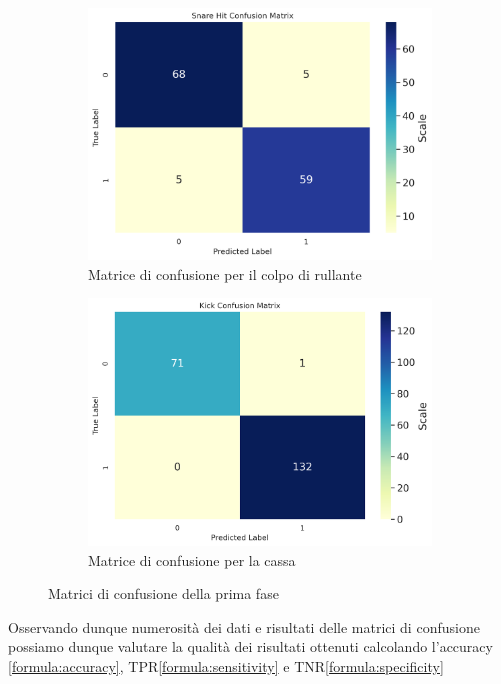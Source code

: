 \begin{figure}[h!]
	\begin{subfigure}{.5\linewidth}
		\includegraphics[width=\linewidth]{./immagini/first_classification/sn_hit_cm.png}
		\caption{Matrice di confusione per il colpo di rullante}
		\label{fig:cm_1c}
	\end{subfigure}\hfill
	\begin{subfigure}{.5\linewidth}
		\includegraphics[width=\linewidth]{./immagini/first_classification/kick_cm.png}
		\caption{Matrice di confusione per la cassa}
		\label{fig:cm_1d}
	\end{subfigure}
	\caption{Matrici di confusione della prima fase}
	\label{fig:cm_1}
\end{figure}

Osservando dunque numerosità dei dati e risultati delle matrici di confusione possiamo dunque valutare la qualità dei risultati ottenuti calcolando l'accuracy \ref{formula:accuracy}, TPR\ref{formula:sensitivity} e TNR\ref{formula:specificity}

